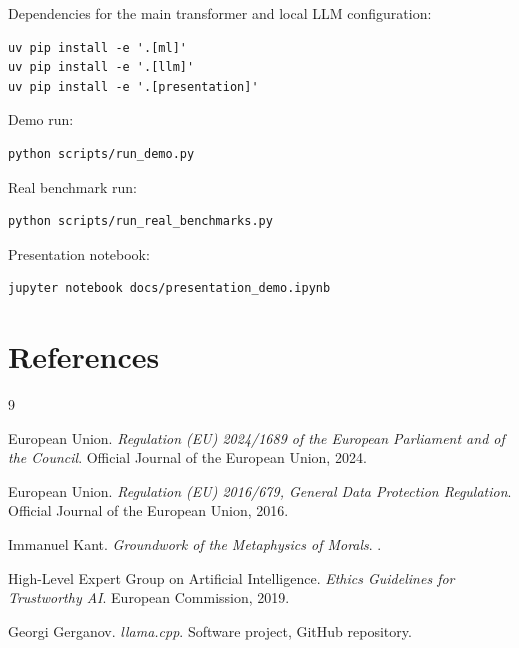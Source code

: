 \documentclass[11pt,a4paper]{article}
\begin{document}
Dependencies for the main transformer and local LLM configuration:

\begin{lstlisting}[style=reportstyle]
uv pip install -e '.[ml]'
uv pip install -e '.[llm]'
uv pip install -e '.[presentation]'
\end{lstlisting}

Demo run:

\begin{lstlisting}[style=reportstyle]
python scripts/run_demo.py
\end{lstlisting}

Real benchmark run:

\begin{lstlisting}[style=reportstyle]
python scripts/run_real_benchmarks.py
\end{lstlisting}

Presentation notebook:

\begin{lstlisting}[style=reportstyle]
jupyter notebook docs/presentation_demo.ipynb
\end{lstlisting}

\section{References}

\begin{thebibliography}{9}

European Union.
\newblock \emph{Regulation (EU) 2024/1689 of the European Parliament and of the Council}.
\newblock Official Journal of the European Union, 2024.

European Union.
\newblock \emph{Regulation (EU) 2016/679, General Data Protection Regulation}.
\newblock Official Journal of the European Union, 2016.

Immanuel Kant.
\newblock \emph{Groundwork of the Metaphysics of Morals}.
.

High-Level Expert Group on Artificial Intelligence.
\newblock \emph{Ethics Guidelines for Trustworthy AI}.
\newblock European Commission, 2019.

Georgi Gerganov.
\newblock \emph{llama.cpp}.
\newblock Software project, GitHub repository.

\end{thebibliography}
\end{document}
